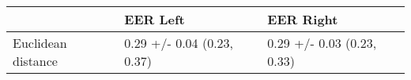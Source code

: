 \begin{tabular}{lll}
\toprule
{} &                    EER Left &                   EER Right \\
\midrule
Euclidean distance &  0.29 +/- 0.04 (0.23, 0.37) &  0.29 +/- 0.03 (0.23, 0.33) \\
\bottomrule
\end{tabular}
